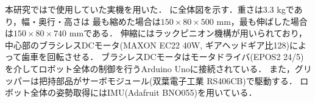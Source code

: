           本研究では\cite{Hijiri:Robomech2024}で使用していた実機を用いた．
          に全体図を示す．重さは3.3 kgであり，幅・奥行・高さは
          最も縮めた場合は$150{\times}80{\times}500$ mm，最も伸ばした場合は$150{\times}80{\times}740$ mmである．
          伸縮にはラックピニオン機構が用いられており，中心部のブラシレスDCモータ(MAXON EC22 40W, ギアヘッドギア比128)によって歯車を回転させる．
          ブラシレスDCモータはモータドライバ(EPOS2 24/5)を介してロボット全体の制御を行うArduino Unoに接続されている．
          また，グリッパーは把持部品がサーボモジュール(双葉電子工業 RS406CB)で駆動する．
          ロボット全体の姿勢取得にはIMU(Adafruit BNO055)を用いている．
          

            
          
